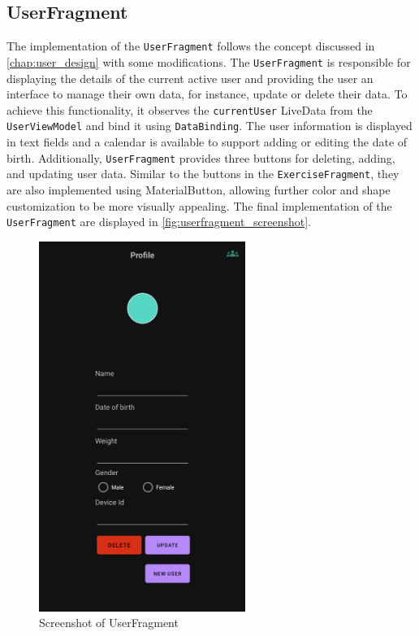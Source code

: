\subsection{UserFragment}
The implementation of the \texttt{UserFragment} follows the concept discussed in \autoref{chap:user_design} with some modifications. 
The \texttt{UserFragment} is responsible for displaying the details of the current active user and providing the user an interface to manage their own data, for instance, update or delete their data. 
To achieve this functionality, it observes the \texttt{currentUser} LiveData from the \texttt{UserViewModel} and bind it using \texttt{DataBinding}. 
The user information is displayed in text fields and a calendar is available to support adding or editing the date of birth. 
Additionally, \texttt{UserFragment} provides three buttons for deleting, adding, and updating user data. Similar to the buttons in the \texttt{ExerciseFragment}, they are also implemented using MaterialButton, allowing further color and shape customization to be more visually appealing.
The final implementation of the \texttt{UserFragment} are displayed in \autoref{fig:userfragment_screenshot}.
\begin{figure}[H]
    \centering
    \includegraphics[width=0.6\textwidth]{images/userfragment-screenshot.png}
    \caption{Screenshot of UserFragment}
    \label{fig:userfragment_screenshot}
\end{figure}

